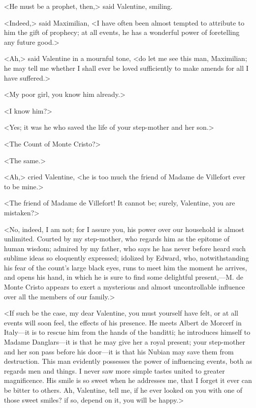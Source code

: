  <He must be a prophet, then,> said Valentine, smiling. 

 <Indeed,> said Maximilian, <I have often been almost tempted to attribute to him the gift of prophecy; at all events, he has a wonderful power of foretelling any future good.> 

 <Ah,> said Valentine in a mournful tone, <do let me see this man, Maximilian; he may tell me whether I shall ever be loved sufficiently to make amends for all I have suffered.> 

 <My poor girl, you know him already.> 

 <I know him?> 

 <Yes; it was he who saved the life of your step-mother and her son.> 

 <The Count of Monte Cristo?> 

 <The same.> 

 <Ah,> cried Valentine, <he is too much the friend of Madame de Villefort ever to be mine.> 

 <The friend of Madame de Villefort! It cannot be; surely, Valentine, you are mistaken?> 

 <No, indeed, I am not; for I assure you, his power over our household is almost unlimited. Courted by my step-mother, who regards him as the epitome of human wisdom; admired by my father, who says he has never before heard such sublime ideas so eloquently expressed; idolized by Edward, who, notwithstanding his fear of the count's large black eyes, runs to meet him the moment he arrives, and opens his hand, in which he is sure to find some delightful present,—M. de Monte Cristo appears to exert a mysterious and almost uncontrollable influence over all the members of our family.> 

 <If such be the case, my dear Valentine, you must yourself have felt, or at all events will soon feel, the effects of his presence. He meets Albert de Morcerf in Italy—it is to rescue him from the hands of the banditti; he introduces himself to Madame Danglars—it is that he may give her a royal present; your step-mother and her son pass before his door—it is that his Nubian may save them from destruction. This man evidently possesses the power of influencing events, both as regards men and things. I never saw more simple tastes united to greater magnificence. His smile is so sweet when he addresses me, that I forget it ever can be bitter to others. Ah, Valentine, tell me, if he ever looked on you with one of those sweet smiles? if so, depend on it, you will be happy.> 

